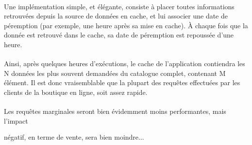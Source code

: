 {  \paragraph{} Une implémentation simple, et élégante, consiste à placer toutes informations
  retrouvées depuis la source de données en cache, et lui associer une date de péremption (par
  exemple, une heure après sa mise en cache). À chaque fois que la donnée est retrouvé dans le
  cache, sa date de péremption est repoussée d'une heure.

  \paragraph{} Ainsi, après quelques heures d'exécutions, le cache de l'application contiendra les
  N données les plus souvent demandées du catalogue complet, contenant M élément. Il est donc
  vraisemblable que la plupart des requêtes effectuées par les clients de la boutique en ligne, soit
  assez rapide.

  \paragraph{} Les requêtes marginales seront bien évidemment moins performantes, mais l'impact
}  négatif, en terme de vente, sera bien moindre...


